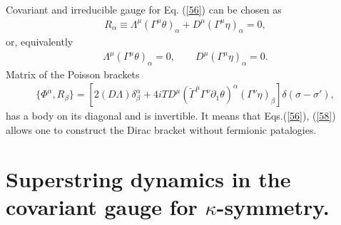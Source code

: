 \documentclass[a4paper]{article}
\begin{document}
Covariant and irreducible gauge for Eq. (\ref{56}) can be chosen as 
\begin{eqnarray}\label{58}
R_\alpha\equiv\Lambda^\mu(\Gamma^\mu\theta)_\alpha+
D^\mu(\Gamma^\mu\eta)_\alpha=0,
\end{eqnarray}
or, equivalently
\begin{eqnarray}\label{59}
\Lambda^\mu(\Gamma^\mu\theta)_\alpha=0, \qquad 
D^\mu(\Gamma^\mu\eta)_\alpha=0.
\end{eqnarray}
Matrix of the Poisson brackets 
\begin{eqnarray}\label{60} 
\{\Phi^\alpha, R_\beta\}=[2(D\Lambda)\delta^\alpha_\beta+
4iTD^\mu(\tilde\Gamma^\mu\Gamma^\nu\partial_1\theta)^\alpha
(\Gamma^\nu\eta)_\beta]\delta(\sigma-\sigma '), 
\end{eqnarray}
has a body on its diagonal and is invertible. It means that 
Eqs.(\ref{56}), (\ref{58}) allows one to construct the Dirac bracket 
without fermionic patalogies.

\section{Superstring dynamics in the covariant gauge 
for $\kappa$-symmetry.}
\end{document}
